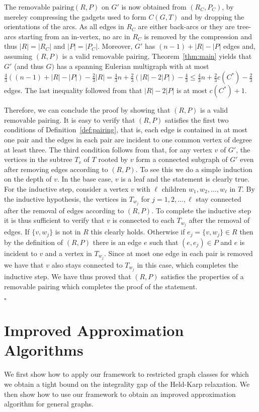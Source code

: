 \documentclass[letterpaper,11pt]{article}
\newenvironment{proof}{\begin{trivlist}
\item[\hskip\labelsep {\bf Proof}.]}{\QED \end{trivlist}}
\newcommand{\QED}{\hfill $\square$}
\newcommand{\MS}{\ensuremath{\mbox{removable pairing}}\xspace}
\begin{document}
\begin{proof}
  The \MS $(R,P)$ on $G'$ is now obtained from $(R_C, P_C)$, by
  mereley compressing the gadgets used to form $C(G,T)$ and by
  dropping the orientations of the arcs. As all edges in $R_C$ are
  either back-arcs or they are tree-arcs starting from an in-vertex,
  no arc in $R_C$ is removed by the compression and thus $|R|=|R_C|$
  and $|P| = |P_C|$. Moreover, $G'$ has $(n-1) + |R| - |P|$
  edges and, assuming $(R,P)$ is a valid \MS, Theorem~\ref{thm:main} 
  yields that $G'$ (and thus $G)$ has a spanning Eulerian multigraph
  with at most $ \frac{4}{3} ((n-1) + |R|-|P|) - \frac{2}{3} |R| =
  \frac{4}{3} n + \frac{2}{3}( |R| - 2|P|) - \frac{4}{3} \leq
  \frac{4}{3} n + \frac{2}{3} c(C^*) - \frac{2}{3} $ edges. The
  last inequality followed  from that $|R| - 2|P|$  is at most
  $c(C^*) +1$.
 
  Therefore, we can conclude the proof by showing that $(R,P)$ is a
  valid \MS.  It is easy to verify that $(R,P)$ satisfies the first
  two conditions of Definition~\ref{def:pairing}, that is, each edge
  is contained in at most one pair and the edges in each pair are
  incident to one common vertex of degree at least three. The third
  condition follows from that, for any vertex $v$ of $G'$, the
  vertices in the subtree $T_v$ of $T$ rooted by $v$ form a connected
  subgraph of $G'$ even after removing edges according to $(R,P)$. To
  see this we do a simple induction on the depth of $v$. In the base
  case, $v$ is a leaf and the statement is clearly true. For the
  inductive step, consider a vertex $v$ with $\ell$ children $w_1,
  w_2, \dots, w_\ell$ in $T$. By the inductive hypothesis, the
  vertices in $T_{w_j}$ for $j=1,2, \dots, \ell$ stay connected after
  the removal of edges according to $(R,P)$. To complete the inductive
  step it is thus sufficient to verify that $v$ is connected to each
  $T_{w_j}$ after the removal of edges. If $\{v,w_j\}$ is not in $R$
  this clearly holds. Otherwise if $e_j = \{v, w_j\} \in R$ then by
  the definition of $(R, P)$ there is an edge $e$ such that $(e, e_j)
  \in P$ and $e$ is incident to $v$ and a vertex in $T_{w_j}$. Since
  at most one edge in each pair is removed we have that $v$ also stays
  connected to $T_{w_j}$ in this case, which completes the inductive
  step. We have thus proved that $(R,P)$ satisfies the properties of a
  \MS which completes the proof of the statement.

\end{proof}

\section{Improved Approximation Algorithms}
\label{sec:algorithms}
We first show how to apply our framework to restricted graph classes
for which we obtain a tight bound on the integrality gap of the
Held-Karp relaxation. We then show how to use our framework to obtain
an improved approximation algorithm for general graphs.
\end{document}
